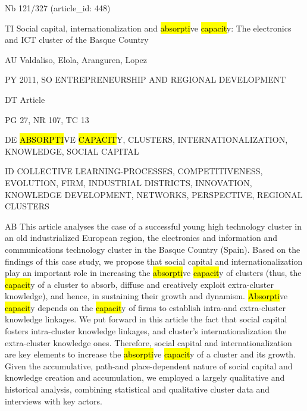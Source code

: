 \documentclass[a4paper]{article}
\begin{document}
\vspace*{-2cm}
Nb \tabto{0cm}121/327 (article\_id: 448)\par
TI \tabto{0cm}Social capital, internationalization and \hl{absorpti}ve \hl{capacit}y: The electronics and ICT cluster of the Basque Country\par
AU \tabto{0cm}Valdaliso, Elola, Aranguren, Lopez\par
PY \tabto{0cm}2011, SO ENTREPRENEURSHIP AND REGIONAL DEVELOPMENT\par
DT \tabto{0cm}Article\par
PG \tabto{0cm}27, NR 107, TC 13\par
DE \tabto{0cm}\hl{ABSORPTI}VE \hl{CAPACIT}Y, CLUSTERS, INTERNATIONALIZATION, KNOWLEDGE, SOCIAL CAPITAL\par
ID \tabto{0cm}COLLECTIVE LEARNING-PROCESSES, COMPETITIVENESS, EVOLUTION, FIRM, INDUSTRIAL DISTRICTS, INNOVATION, KNOWLEDGE DEVELOPMENT, NETWORKS, PERSPECTIVE, REGIONAL CLUSTERS\par
AB \tabto{0cm}This article analyses the case of a successful young high technology cluster in an old industrialized European region, the electronics and information and communications technology cluster in the Basque Country (Spain). Based on the findings of this case study, we propose that social capital and internationalization play an important role in increasing the \hl{absorpti}ve \hl{capacit}y of clusters (thus, the \hl{capacit}y of a cluster to absorb, diffuse and creatively exploit extra-cluster knowledge), and hence, in sustaining their growth and dynamism. \hl{Absorpti}ve \hl{capacit}y depends on the \hl{capacit}y of firms to establish intra-and extra-cluster knowledge linkages. We put forward in this article the fact that social capital fosters intra-cluster knowledge linkages, and cluster's internationalization the extra-cluster knowledge ones. Therefore, social capital and internationalization are key elements to increase the \hl{absorpti}ve \hl{capacit}y of a cluster and its growth. Given the accumulative, path-and place-dependent nature of social capital and knowledge creation and accumulation, we employed a largely qualitative and historical analysis, combining statistical and qualitative cluster data and interviews with key actors.\par
\clearpage
\end{document}
